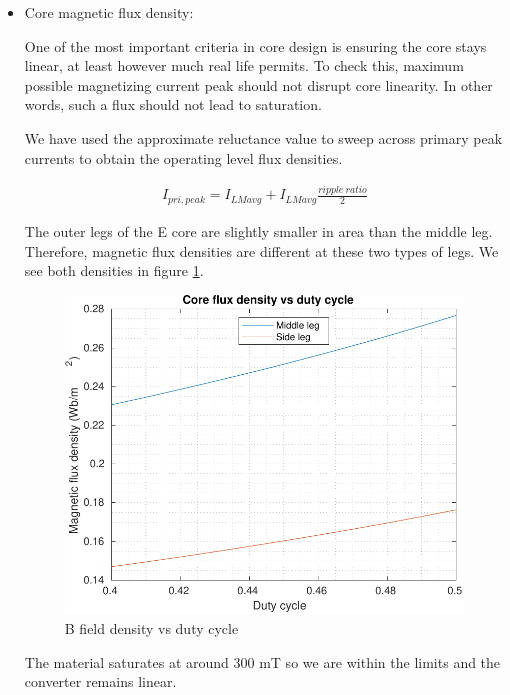 \documentclass[12pt]{article}
\begin{document}
\begin{itemize}
        \item Core magnetic flux density:

        One of the most important criteria in core design is ensuring the core stays linear, at least however much real life permits. To check this, maximum possible magnetizing current peak should not disrupt core linearity. In other words, such a flux should not lead to saturation.

        We have used the approximate reluctance value to sweep across primary peak currents to obtain the operating level flux densities. 

        \begin{align*}
            I_{pri,peak} = I_{LMavg} + I_{LMavg}\frac{ripple \: ratio}{2}
        \end{align*}

        The outer legs of the E core are slightly smaller in area than the middle leg. Therefore, magnetic flux densities are different at these two types of legs. We see both densities in figure \ref{fig:B}.

        \begin{figure}[H]
            \centering
            \includegraphics{img/B.pdf}
            \caption{B field density vs duty cycle}
            \label{fig:B}
        \end{figure}

        The material saturates at around 300 mT \cite{core} so we are within the limits and the converter remains linear.
    \end{itemize}
    
\end{document}
